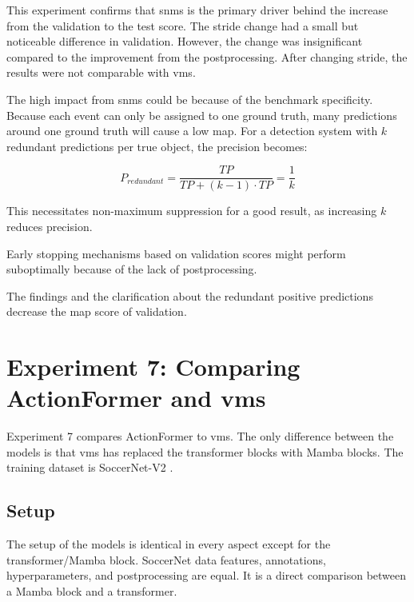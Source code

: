 This experiment confirms that \acrshort{snms} is the primary driver behind the increase from the validation to the test score. The stride change had a small but noticeable difference in validation. However, the change was insignificant compared to the improvement from the postprocessing. After changing stride, the results were not comparable with \acrshort{vms}. 

The high impact from \acrshort{snms} could be because of the benchmark specificity. Because each event can only be assigned to one ground truth, many predictions around one ground truth will cause a low \acrlong{map}. For a detection system with $k$ redundant predictions per true object, the precision becomes:

\[P_{redundant} = \frac{TP}{TP + (k-1) \cdot TP} = \frac{1}{k}\]

This necessitates non-maximum suppression for a good result, as increasing $k$ reduces precision. 


Early stopping mechanisms based on validation scores might perform suboptimally because of the lack of postprocessing. 

The findings and the clarification about the redundant positive predictions decrease the \acrshort{map} score of validation.

\section{Experiment 7: Comparing ActionFormer and \acrlong{vms}}
\label{sec:experiment_7}

Experiment 7 compares ActionFormer to \acrshort{vms}. The only difference between the models is that \acrshort{vms} has replaced the transformer blocks with Mamba blocks. The training dataset is SoccerNet-V2 \cite{deliege_soccernet-v2_dataset_2021}.

\subsection{Setup}

The setup of the models is identical in every aspect except for the transformer/Mamba block. SoccerNet data features, annotations, hyperparameters, and postprocessing are equal. It is a direct comparison between a Mamba block and a transformer.

